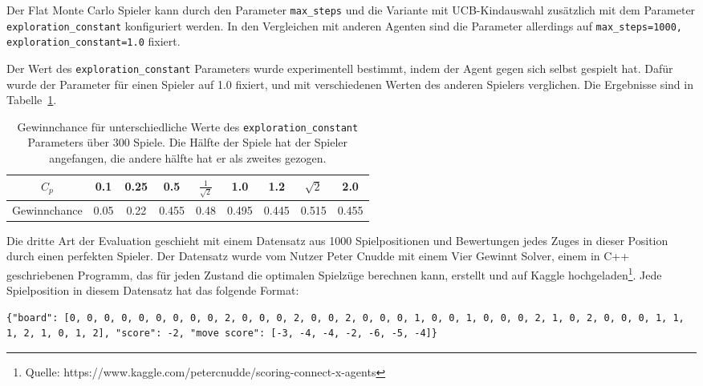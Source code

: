 Der Flat Monte Carlo Spieler kann durch den Parameter \verb|max_steps| und die Variante mit UCB-Kindauswahl zusätzlich mit dem Parameter \verb|exploration_constant| konfiguriert werden.
In den Vergleichen mit anderen Agenten sind die Parameter allerdings auf \verb|max_steps=1000, exploration_constant=1.0| fixiert.

Der Wert des \verb|exploration_constant| Parameters wurde experimentell bestimmt, indem der Agent gegen sich selbst gespielt hat.
Dafür wurde der Parameter für einen Spieler auf 1.0 fixiert, und mit verschiedenen Werten des anderen Spielers verglichen.
Die Ergebnisse sind in Tabelle~\ref{tab:flat-mc}.

\begin{table}[h!]
\centering
\begin{tabular}{ |c||c|c|c|c|c|c|c|c| }
 \hline
 $C_p$ & 0.1 & 0.25 & 0.5 & $\frac{1}{\sqrt{2}}$ & 1.0 & 1.2 & $\sqrt{2}$ & 2.0 \\
 \hline
 Gewinnchance & 0.05 & 0.22 & 0.455 & 0.48 & 0.495 & 0.445 & 0.515 & 0.455 \\
 \hline
\end{tabular}
\caption{Gewinnchance für unterschiedliche Werte des \verb|exploration_constant| Parameters über 300 Spiele. Die Hälfte der Spiele hat der Spieler angefangen, die andere hälfte hat er als zweites gezogen.}
\label{tab:flat-mc}
\end{table}

Die dritte Art der Evaluation geschieht mit einem Datensatz aus 1000 Spielpositionen und Bewertungen jedes Zuges in dieser Position durch einen perfekten Spieler.
Der Datensatz wurde vom Nutzer Peter Cnudde mit einem Vier Gewinnt Solver, einem in C++ geschriebenen Programm, das für jeden Zustand die optimalen Spielzüge berechnen kann, erstellt und auf Kaggle hochgeladen\footnote{Quelle: https://www.kaggle.com/petercnudde/scoring-connect-x-agents}.
Jede Spielposition in diesem Datensatz hat das folgende Format:

\begin{verbatim}
{"board": [0, 0, 0, 0, 0, 0, 0, 0, 0, 2, 0, 0, 0, 2, 0, 0, 2, 0, 0, 0, 1, 0, 0, 1, 0, 0, 0, 2, 1, 0, 2, 0, 0, 0, 1, 1, 1, 2, 1, 0, 1, 2], "score": -2, "move score": [-3, -4, -4, -2, -6, -5, -4]}
\end{verbatim}

